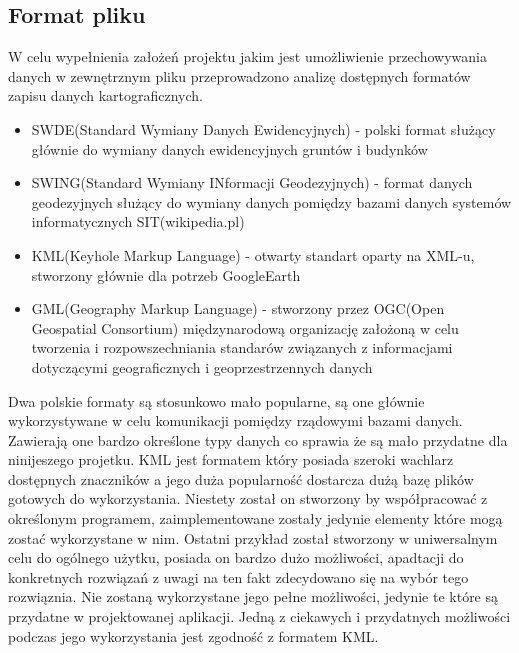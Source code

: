 \subsection{Format pliku}
\label{subsec:fileformat}

W celu wypełnienia założeń projektu jakim jest umożliwienie przechowywania danych w zewnętrznym pliku przeprowadzono analizę dostępnych formatów zapisu danych kartograficznych.

\begin{itemize}

\item
SWDE(Standard Wymiany Danych Ewidencyjnych) - polski format służący głównie do wymiany danych ewidencyjnych gruntów i budynków

\item
SWING(Standard Wymiany INformacji Geodezyjnych) - format danych geodezyjnych służący do wymiany danych pomiędzy bazami danych systemów informatycznych SIT(wikipedia.pl)

\item
KML(Keyhole Markup Language) - otwarty standart oparty na XML-u, stworzony głównie dla potrzeb GoogleEarth

\item
GML(Geography Markup Language) - stworzony przez OGC(Open Geospatial Consortium) międzynarodową organizację założoną w celu tworzenia i rozpowszechniania standarów związanych z informacjami dotyczącymi geograficznych i geoprzestrzennych danych

\end{itemize}

Dwa polskie formaty są stosunkowo mało popularne, są one głównie wykorzystywane w celu komunikacji pomiędzy rządowymi bazami danych. Zawierają one bardzo określone typy danych co sprawia że są mało przydatne dla ninijeszego projetku. KML jest formatem który posiada szeroki wachlarz dostępnych znaczników a jego duża popularność dostarcza dużą bazę plików gotowych do wykorzystania. Niestety został on stworzony by współpracować z określonym programem, zaimplementowane zostały jedynie elementy które mogą zostać wykorzystane w nim. Ostatni przykład został stworzony w uniwersalnym celu do ogólnego użytku, posiada on bardzo dużo możliwości, apadtacji do konkretnych rozwiązań\cite{gml} z uwagi na ten fakt zdecydowano się na wybór tego rozwiąznia. Nie zostaną wykorzystane jego pełne możliwości, jedynie te które są przydatne w projektowanej aplikacji.
Jedną z ciekawych i przydatnych możliwości podczas jego wykorzystania jest zgodność z formatem KML.


